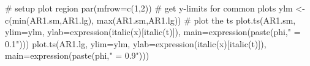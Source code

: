 \begin{Schunk}
\begin{Sinput}
 # setup plot region
 par(mfrow=c(1,2))
 # get y-limits for common plots
 ylm <- c(min(AR1.sm,AR1.lg), max(AR1.sm,AR1.lg))
 # plot the ts
 plot.ts(AR1.sm, ylim=ylm,
         ylab=expression(italic(x)[italic(t)]),
         main=expression(paste(phi," = 0.1")))
 plot.ts(AR1.lg, ylim=ylm,
         ylab=expression(italic(x)[italic(t)]),
         main=expression(paste(phi," = 0.9")))
\end{Sinput}
\end{Schunk}
